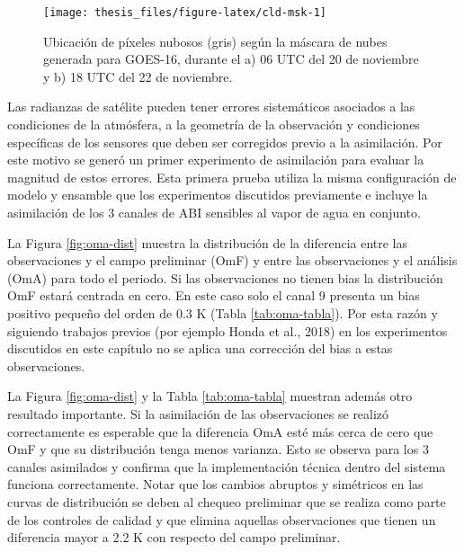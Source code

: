 \documentclass[12pt,oneside,a4paper]{reedthesis}
\begin{document}
\begin{figure}
\texttt{[image: thesis\_files/figure-latex/cld-msk-1]} \caption{Ubicación de píxeles nubosos (gris) según la máscara de nubes generada para GOES-16, durante el a) 06 UTC del 20 de noviembre y b) 18 UTC del 22 de noviembre.}\label{fig:cld-msk}
\end{figure}
Las radianzas de satélite pueden tener errores sistemáticos asociados a las condiciones de la atmósfera, a la geometría de la observación y condiciones específicas de los sensores que deben ser corregidos previo a la asimilación. Por este motivo se generó un primer experimento de asimilación para evaluar la magnitud de estos errores. Esta primera prueba utiliza la misma configuración de modelo y ensamble que los experimentos discutidos previamente e incluye la asimilación de los 3 canales de ABI sensibles al vapor de agua en conjunto.

La Figura \ref{fig:oma-dist} muestra la distribución de la diferencia entre las observaciones y el campo preliminar (OmF) y entre las observaciones y el análisis (OmA) para todo el periodo. Si las observaciones no tienen bias la distribución OmF estará centrada en cero. En este caso solo el canal 9 presenta un bias positivo pequeño del orden de 0.3 K (Tabla \ref{tab:oma-tabla}). Por esta razón y siguiendo trabajos previos (por ejemplo Honda et al., 2018) en los experimentos discutidos en este capítulo no se aplica una corrección del bias a estas observaciones.

La Figura \ref{fig:oma-dist} y la Tabla \ref{tab:oma-tabla} muestran además otro resultado importante. Si la asimilación de las observaciones se realizó correctamente es esperable que la diferencia OmA esté más cerca de cero que OmF y que su distribución tenga menos varianza. Esto se observa para los 3 canales asimilados y confirma que la implementación técnica dentro del sistema funciona correctamente. Notar que los cambios abruptos y simétricos en las curvas de distribución se deben al chequeo preliminar que se realiza como parte de los controles de calidad y que elimina aquellas observaciones que tienen un diferencia mayor a 2.2 K con respecto del campo preliminar.
\end{document}
